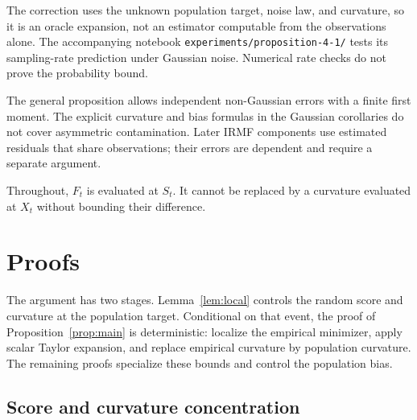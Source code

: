 \documentclass[11pt]{article}
\begin{document}
The correction uses the unknown population target, noise law, and curvature,
so it is an oracle expansion, not an estimator computable from the observations
alone.  The accompanying notebook
\texttt{experiments/proposition-4-1/} tests its sampling-rate prediction under
Gaussian noise.  Numerical rate checks do not prove the probability bound.

The general proposition allows independent non-Gaussian errors with a finite
first moment.  The explicit curvature and bias formulas in the Gaussian
corollaries do not cover asymmetric contamination.  Later IRMF components use
estimated residuals that share observations; their errors are dependent and
require a separate argument.

Throughout, \(F_t\) is evaluated at \(S_t\).  It cannot be replaced by a
curvature evaluated at \(X_t\) without bounding their difference.


\clearpage
\appendix
\section{Proofs}\label{sec:proofs}

The argument has two stages.  Lemma~\ref{lem:local} controls the random score
and curvature at the population target.  Conditional on that event, the proof
of Proposition~\ref{prop:main} is deterministic: localize the empirical
minimizer, apply scalar Taylor expansion, and replace empirical curvature by
population curvature.  The remaining proofs specialize these bounds and
control the population bias.

\subsection{Score and curvature concentration}
\end{document}
